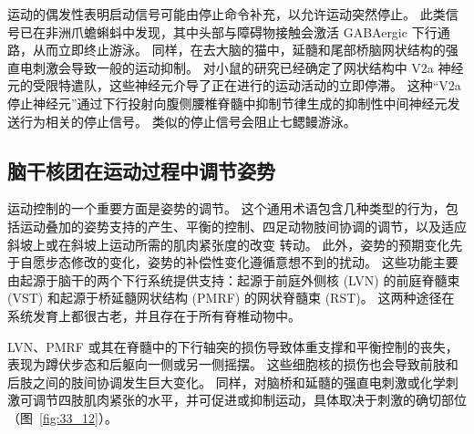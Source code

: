 运动的偶发性表明启动信号可能由停止命令补充，以允许运动突然停止。
此类信号已在非洲爪蟾蝌蚪中发现，其中头部与障碍物接触会激活 GABAergic 下行通路，从而立即终止游泳。
同样，在去大脑的猫中，延髓和尾部桥脑网状结构的强直电刺激会导致一般的运动抑制。
对小鼠的研究已经确定了网状结构中 V2a 神经元的受限特遣队，这些神经元介导了正在进行的运动活动的立即停滞。
这种“V2a 停止神经元”通过下行投射向腹侧腰椎脊髓中抑制节律生成的抑制性中间神经元发送行为相关的停止信号。
类似的停止信号会阻止七鳃鳗游泳。



\subsection{脑干核团在运动过程中调节姿势}

运动控制的一个重要方面是姿势的调节。
这个通用术语包含几种类型的行为，包括运动叠加的姿势支持的产生、平衡的控制、四足动物肢间协调的调节，以及适应斜坡上或在斜坡上运动所需的肌肉紧张度的改变 转动。
此外，姿势的预期变化先于自愿步态修改的变化，姿势的补偿性变化遵循意想不到的扰动。
这些功能主要由起源于脑干的两个下行系统提供支持：起源于前庭外侧核 (LVN) 的前庭脊髓束 (VST) 和起源于桥延髓网状结构 (PMRF) 的网状脊髓束 (RST)。
这两种途径在系统发育上都很古老，并且存在于所有脊椎动物中。


LVN、PMRF 或其在脊髓中的下行轴突的损伤导致体重支撑和平衡控制的丧失，表现为蹲伏步态和后躯向一侧或另一侧摇摆。
这些细胞核的损伤也会导致前肢和后肢之间的肢间协调发生巨大变化。
同样，对脑桥和延髓的强直电刺激或化学刺激可调节四肢肌肉紧张的水平，并可促进或抑制运动，具体取决于刺激的确切部位（图~\ref{fig:33_12}）。


